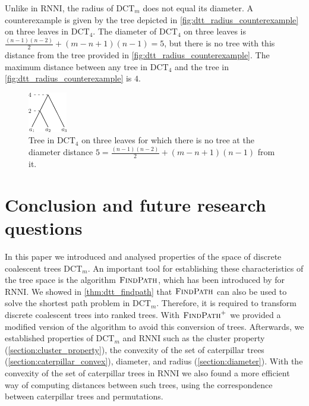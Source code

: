 \documentclass[11pt]{amsart}
\newcommand{\rnni}{\mathrm{RNNI}}
\newcommand{\findpath}{\textsc{FindPath}}
\newcommand{\dct}{\mathrm{DCT}}
\newcommand{\summary}[1]{} %
\begin{document}
Unlike in $\rnni$, the radius of $\dct_m$ does not equal its diameter.
A counterexample is given by the tree depicted in \autoref{fig:dtt_radius_counterexample} on three leaves in $\dct_4$.
The diameter of $\dct_4$ on three leaves is $\frac{(n-1)(n-2)}{2} + (m-n+1)(n-1) = 5$, but there is no tree with this distance from the tree provided in \autoref{fig:dtt_radius_counterexample}.
The maximum distance between any tree in $\dct_4$ and the tree in \autoref{fig:dtt_radius_counterexample} is $4$.

\begin{figure}[ht]
	\includegraphics[width=0.15\textwidth]{dtt_radius_counterexample.eps}
	\caption{Tree in $\dct_4$ on three leaves for which there is no tree at the diameter distance $5 = \frac{(n-1)(n-2)}{2} + (m-n+1)(n-1)$ from it.}
	\label{fig:dtt_radius_counterexample}
\end{figure}


\section{Conclusion and future research questions}
\label{section:open_problems}

\summary{Brief summary of results of the paper}
In this paper we introduced and analysed properties of the space of discrete coalescent trees $\dct_m$.
An important tool for establishing these characteristics of the tree space is the algorithm $\findpath$, which has been introduced by \textcite{Collienne2021} for $\rnni$.
We showed in \autoref{thm:dtt_findpath} that $\findpath$ can also be used to solve the shortest path problem in $\dct_m$.
Therefore, it is required to transform discrete coalescent trees into ranked trees.
With $\findpath^+$ we provided a modified version of the algorithm to avoid this conversion of trees.
Afterwards, we established properties of $\dct_m$ and $\rnni$ such as the cluster property (\autoref{section:cluster_property}), the convexity of the set of caterpillar trees (\autoref{section:caterpillar_convex}), diameter, and radius (\autoref{section:diameter}).
With the convexity of the set of caterpillar trees in $\rnni$ we also found a more efficient way of computing distances between such trees, using the correspondence between caterpillar trees and permutations.
\end{document}
